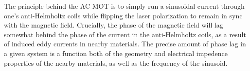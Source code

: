 The principle behind the AC-MOT is to simply run a sinusoidal current through one's anti-Helmholtz coils while flipping the laser polarization to remain in sync with the magnetic field.  Crucially, the phase of the magnetic field will lag somewhat behind the phase of the current in the anti-Helmholtz coils, as a result of induced eddy currents in nearby materials.  The precise amount of phase lag in a given system is a function both of the geometry and electrical impedence properties of the nearby materials, as well as the frequency of the sinusoid.  

\note[note]{}




